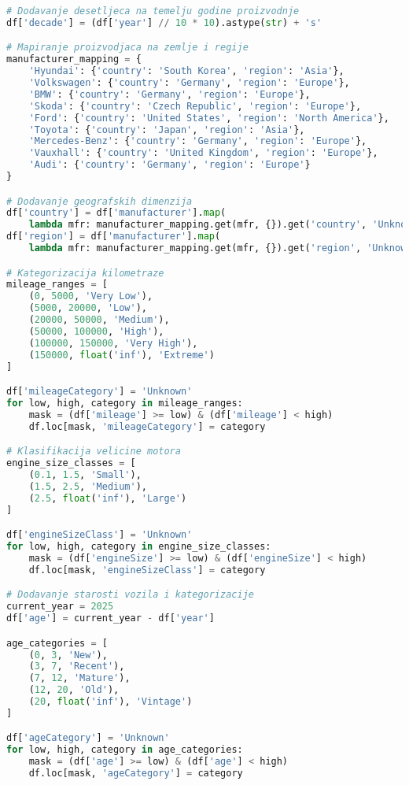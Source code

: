 \begin{lstlisting}[language=Python, caption={Prosirenje skupa podataka novim dimenzijama}]
# Dodavanje desetljeca na temelju godine proizvodnje
df['decade'] = (df['year'] // 10 * 10).astype(str) + 's'

# Mapiranje proizvodjaca na zemlje i regije
manufacturer_mapping = {
    'Hyundai': {'country': 'South Korea', 'region': 'Asia'},
    'Volkswagen': {'country': 'Germany', 'region': 'Europe'},
    'BMW': {'country': 'Germany', 'region': 'Europe'},
    'Skoda': {'country': 'Czech Republic', 'region': 'Europe'},
    'Ford': {'country': 'United States', 'region': 'North America'},
    'Toyota': {'country': 'Japan', 'region': 'Asia'},
    'Mercedes-Benz': {'country': 'Germany', 'region': 'Europe'},
    'Vauxhall': {'country': 'United Kingdom', 'region': 'Europe'},
    'Audi': {'country': 'Germany', 'region': 'Europe'}
}

# Dodavanje geografskih dimenzija
df['country'] = df['manufacturer'].map(
    lambda mfr: manufacturer_mapping.get(mfr, {}).get('country', 'Unknown'))
df['region'] = df['manufacturer'].map(
    lambda mfr: manufacturer_mapping.get(mfr, {}).get('region', 'Unknown'))

# Kategorizacija kilometraze
mileage_ranges = [
    (0, 5000, 'Very Low'),
    (5000, 20000, 'Low'), 
    (20000, 50000, 'Medium'),
    (50000, 100000, 'High'),
    (100000, 150000, 'Very High'),
    (150000, float('inf'), 'Extreme')
]

df['mileageCategory'] = 'Unknown'
for low, high, category in mileage_ranges:
    mask = (df['mileage'] >= low) & (df['mileage'] < high)
    df.loc[mask, 'mileageCategory'] = category

# Klasifikacija velicine motora
engine_size_classes = [
    (0.1, 1.5, 'Small'),
    (1.5, 2.5, 'Medium'),
    (2.5, float('inf'), 'Large')
]

df['engineSizeClass'] = 'Unknown'
for low, high, category in engine_size_classes:
    mask = (df['engineSize'] >= low) & (df['engineSize'] < high)
    df.loc[mask, 'engineSizeClass'] = category

# Dodavanje starosti vozila i kategorizacije
current_year = 2025
df['age'] = current_year - df['year']

age_categories = [
    (0, 3, 'New'),
    (3, 7, 'Recent'),
    (7, 12, 'Mature'),
    (12, 20, 'Old'),
    (20, float('inf'), 'Vintage')
]

df['ageCategory'] = 'Unknown'
for low, high, category in age_categories:
    mask = (df['age'] >= low) & (df['age'] < high)
    df.loc[mask, 'ageCategory'] = category
\end{lstlisting}

